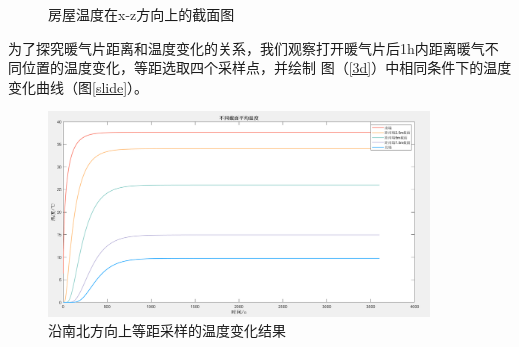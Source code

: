 \documentclass{my_paper}
\begin{document}
\begin{figure}[htbp]
    \centering  %
    \caption{房屋温度在x-z方向上的截面图}    %
    \label{3d2}    %
\end{figure}

\newpage
为了探究暖气片距离和温度变化的关系，我们观察打开暖气片后1h内距离暖气不同位置的温度变化，等距选取四个采样点，并绘制 图（\ref{3d}）中相同条件下的温度变化曲线（图\ref{slide}）。


\begin {figure}[h]
\centering %
\includegraphics[width=0.9\textwidth]{slide.png}
\caption{沿南北方向上等距采样的温度变化结果} %
\label{five}
\end {figure}
\end{document}
